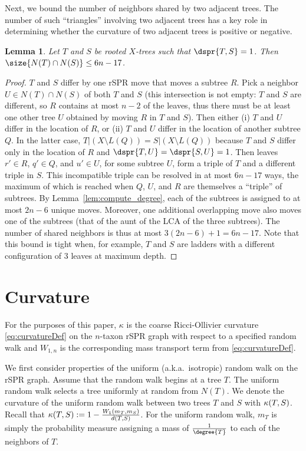 \documentclass[11pt,onecolumn,conference]{IEEEtran}
\newtheorem{lemma}[theorem]{Lemma}
\newcommand{\curvature}[2][]{%
    \ifthenelse{\equal{#1}{}}%
		{\kappa(#2)}%
		{\kappa_{#1}(#2)}%
}
\begin{document}
Next, we bound the number of neighbors shared by two adjacent trees.
The number of such ``triangles'' involving two adjacent trees has a key role in determining whether the curvature of two adjacent trees is positive or negative.

\begin{lemma}
	\label{lem:shared_neighbors}
Let $T$ and $S$ be rooted $X$-trees such that $\dspr{T,S} = 1$.
Then $\size{N(T) \cap N(S)} \le 6n - 17$.
\end{lemma}

\begin{proof}
	$T$ and $S$ differ by one rSPR move that moves a subtree $R$.
	Pick a neighbor $U \in N(T) \cap N(S)$ of both $T$ and $S$ (this intersection is not empty: $T$ and $S$ are different, so $R$ contains at most $n-2$ of the leaves, thus there must be at least one other tree $U$ obtained by moving $R$ in $T$ and $S$).
	Then either (i) $T$ and $U$ differ in the location of $R$, or (ii) $T$ and $U$ differ in the location of another subtree $Q$.
	In the latter case, $T|(X \setminus L(Q)) = S|(X \setminus L(Q))$ because $T$ and $S$ differ only in the location of $R$ and $\dspr{T,U} = \dspr{S,U} = 1$.
	Then leaves $r' \in R$, $q' \in Q$, and $u' \in U$, for some subtree $U$, form a triple of $T$ and a different triple in $S$.
	This incompatible triple can be resolved in at most $6n - 17$ ways, the maximum of which is reached when $Q$, $U$, and $R$ are themselves a ``triple'' of subtrees.
	By Lemma~\ref{lem:compute_degree}, each of the subtrees is assigned to at most $2n-6$ unique moves.
	Moreover, one additional overlapping move also moves one of the subtrees (that of the aunt of the LCA of the three subtrees).
	The number of shared neighbors is thus at most $3(2n-6) + 1 = 6n-17$.
	Note that this bound is tight when, for example, $T$ and $S$ are ladders with a different configuration of 3 leaves at maximum depth.
\end{proof}



\section{Curvature}
For the purposes of this paper, $\kappa$ is the coarse Ricci-Ollivier curvature \eqref{eq:curvatureDef} on the $n$-taxon rSPR graph with respect to a specified random walk and $W_{1,n}$ is the corresponding mass transport term from \eqref{eq:curvatureDef}.

We first consider properties of the uniform (a.k.a.\ isotropic) random walk on the rSPR graph.
Assume that the random walk begins at a tree $T$.
The uniform random walk selects a tree uniformly at random from $N(T)$.
We denote the curvature of the uniform random walk between two trees $T$ and $S$ with $\curvature{T,S}$.
Recall that $\curvature{T, S} := 1 - \frac{W_1(m_T, m_S)}{d(T, S)}$.
For the uniform random walk, $m_T$ is simply the probability measure assigning a mass of $\frac{1}{\degree{T}}$ to each of the neighbors of $T$.
\end{document}

